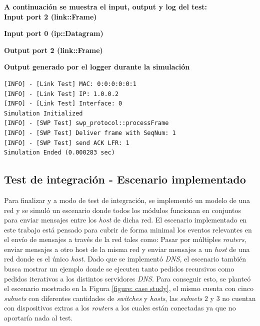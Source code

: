 \documentclass[10pt,a4paper]{article}
\begin{document}
\textbf{A continuación se muestra el input, output y log del test:} \\

\textbf{Input port 2 (link::Frame)}


\textbf{Input port 0 (ip::Datagram)}


\textbf{Output port 2 (link::Frame)}


\textbf{Output generado por el logger durante la simulación}
\begin{lstlisting}
[INFO] - [Link Test] MAC: 0:0:0:0:0:1
[INFO] - [Link Test] IP: 1.0.0.2
[INFO] - [Link Test] Interface: 0
Simulation Initialized
[INFO] - [SWP Test] swp_protocol::processFrame
[INFO] - [SWP Test] Deliver frame with SeqNum: 1
[INFO] - [SWP Test] send ACK LFR: 1
Simulation Ended (0.000283 sec)
\end{lstlisting}

\subsection{Test de integración - Escenario implementado}

Para finalizar y a modo de test de integración, se implementó un modelo de una red y se simuló un escenario donde todos los módulos funcionan en conjuntos para enviar mensajes entre los \textit{host} de dicha red. El escenario implementado en este trabajo está pensado para cubrir de forma minimal los eventos relevantes en el envío de mensajes a través de la red tales como: Pasar por múltiples \textit{routers}, enviar mensajes a otro host de la misma red y enviar mensajes a un \textit{host} de una red donde es el único \textit{host}. Dado que se implementó \textit{DNS}, el escenario también busca mostrar un ejemplo donde se ejecuten tanto pedidos recursivos como pedidos iterativos a los distintos servidores \textit{DNS}. Para conseguir esto, se planteó el escenario mostrado en la Figura \ref{figure: case study}, el mismo cuenta con cinco \textit{subnets} con diferentes cantidades de \textit{switches} y \textit{hosts}, las \textit{subnets} $2$ y $3$ no cuentan con dispositivos extras a los \textit{routers} a los cuales están conectadas ya que no aportaría nada al test. \\
\end{document}
